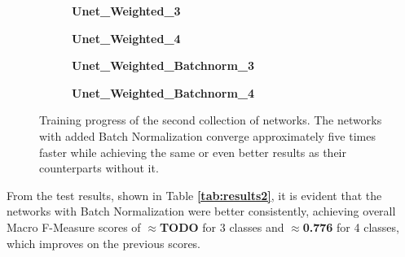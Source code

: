 \begin {figure}[!ht]
	\begin {subfigure}[b]{0.4\linewidth}
		\scalebox{0.65}{}
		\caption{\textbf{Unet\_Weighted\_3}}
	\end {subfigure}\hspace{1.75cm}
	\begin {subfigure}[b]{0.4\linewidth}
		\scalebox{0.65}{}
		\caption{\textbf{Unet\_Weighted\_4}}
	\end {subfigure}

	\begin {subfigure}[b]{0.4\linewidth}
		\scalebox{0.65}{}
		\caption{\textbf{Unet\_Weighted\_Batchnorm\_3}}
	\end {subfigure}\hspace{1.75cm}
	\begin {subfigure}[b]{0.4\linewidth}
		\scalebox{0.65}{}
		\caption{\textbf{Unet\_Weighted\_Batchnorm\_4}}
	\end {subfigure}

		\caption[Training progress of the second collection of networks.]{Training progress of the second collection of networks. The networks with added Batch Normalization converge approximately five times faster while achieving the same or even better results as their counterparts without it.}
		\label{fig:weighted_weighted_batchnorm_training}
\end {figure}

\noindent From the test results, shown in Table \textbf{\ref{tab:results2}}, it is evident that the networks with Batch Normalization were better consistently, achieving overall Macro F-Measure scores of $\approx$\textbf{TODO} for 3 classes and $\approx$\textbf{0.776} for 4 classes, which improves on the previous scores.\\


